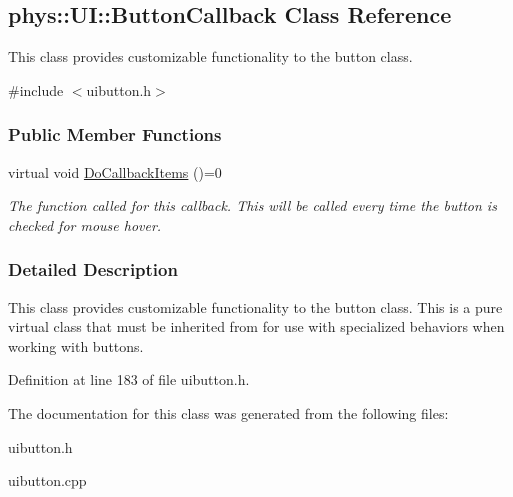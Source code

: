 \hypertarget{classphys_1_1UI_1_1ButtonCallback}{
\subsection{phys::UI::ButtonCallback Class Reference}
\label{df/dcb/classphys_1_1UI_1_1ButtonCallback}
}


This class provides customizable functionality to the button class.  




{\ttfamily \#include $<$uibutton.h$>$}

\subsubsection*{Public Member Functions}
\begin{DoxyCompactItemize}
\item 
\hypertarget{classphys_1_1UI_1_1ButtonCallback_a34e416ce289a5a786b59ccbd44f5dfda}{
virtual void \hyperlink{classphys_1_1UI_1_1ButtonCallback_a34e416ce289a5a786b59ccbd44f5dfda}{DoCallbackItems} ()=0}
\label{df/dcb/classphys_1_1UI_1_1ButtonCallback_a34e416ce289a5a786b59ccbd44f5dfda}

\begin{DoxyCompactList}\small\item\em The function called for this callback. This will be called every time the button is checked for mouse hover. \item\end{DoxyCompactList}\end{DoxyCompactItemize}


\subsubsection{Detailed Description}
This class provides customizable functionality to the button class. This is a pure virtual class that must be inherited from for use with specialized behaviors when working with buttons. 

Definition at line 183 of file uibutton.h.



The documentation for this class was generated from the following files:\begin{DoxyCompactItemize}
\item 
uibutton.h\item 
uibutton.cpp\end{DoxyCompactItemize}
